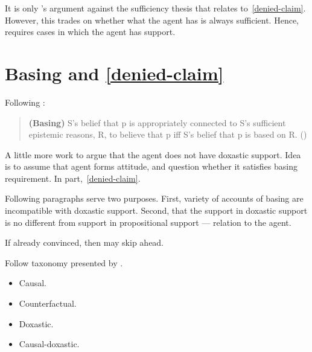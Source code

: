 It is only \citeauthor{Littlejohn:2018uq}'s argument against the sufficiency thesis that relates to~\ref{denied-claim}.
However, this trades on whether what the agent has is always sufficient.
Hence, requires cases in which the agent has support.




\section{Basing and \ref{denied-claim}}

\begin{note}[Basing]
  Following \citeauthor{Silva:2020aa}:
  \begin{quote}
    \textbf{(Basing)} S's belief that p is appropriately connected to S's sufficient epistemic reasons, R, to believe that p iff S's belief that p is based on R.\linebreak
    \mbox{}\hfill\mbox{(\citeyear{Silva:2020aa})}
  \end{quote}
\end{note}


\begin{note}
  A little more work to argue that the agent does not have doxastic support.
  Idea is to assume that agent forms attitude, and question whether it satisfies basing requirement.
  In part,~\ref{denied-claim}.
\end{note}

\begin{note}
  Following paragraphs serve two purposes.
  First, variety of accounts of basing are incompatible with doxastic support.
  Second, that the support in doxastic support is no different from support in propositional support --- relation to the agent.

  If already convinced, then may skip ahead.
\end{note}

\begin{note}
  Follow taxonomy presented by \textcite{Korcz:2021ue}.
  \begin{itemize}
  \item Causal.
  \item Counterfactual.
  \item Doxastic.
  \item Causal-doxastic.
  \end{itemize}
\end{note}

